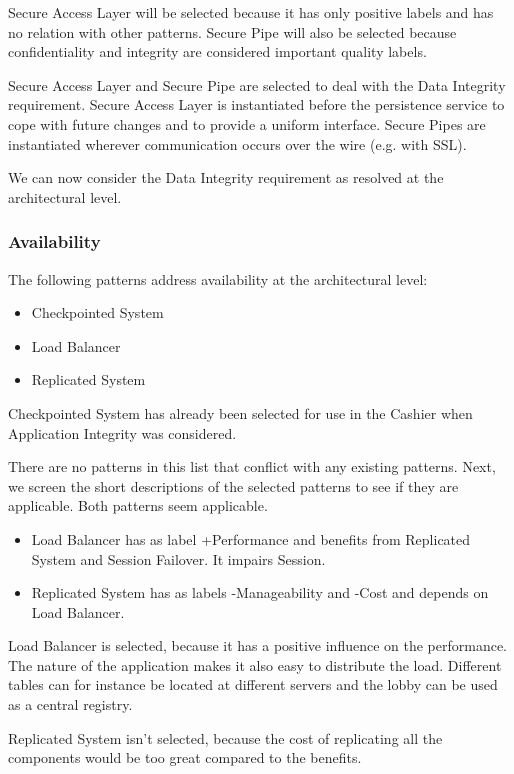 \documentclass[a4paper,11pt]{report}
\begin{document}
Secure Access Layer will be selected because it has only positive labels and has no relation with other patterns.
Secure Pipe will also be selected because confidentiality and integrity are considered important quality labels.

Secure Access Layer and Secure Pipe are selected to deal with the Data Integrity requirement. Secure Access Layer is instantiated before the persistence service to cope with future changes and to provide a uniform interface. Secure Pipes are instantiated wherever communication occurs over the wire (e.g. with SSL).

We can now consider the Data Integrity requirement as resolved at the architectural level.
\subsubsection{Availability}
The following patterns address availability at the architectural level:
\begin{itemize}
\item Checkpointed System
\item Load Balancer
\item Replicated System
\end{itemize}

Checkpointed System has already been selected for use in the Cashier when Application Integrity was considered.

There are no patterns in this list that conflict with any existing patterns.
Next, we screen the short descriptions of the selected patterns to see if they are applicable. Both patterns seem
applicable.

\begin{itemize}
\item Load Balancer has as label +Performance and benefits from Replicated System and Session Failover. It impairs
Session.
\item Replicated System has as labels -Manageability and -Cost and depends on Load Balancer.
\end{itemize}

Load Balancer is selected, because it has a positive influence on the performance. The nature of the application
makes it also easy to distribute the load. Different tables can for instance be located at different servers and the lobby can be used as a central registry.

Replicated System isn't selected, because the cost of replicating all the components would be too great compared
to the benefits.
\end{document}
